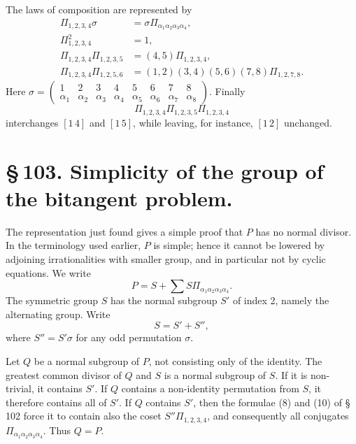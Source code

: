 \documentclass[11pt]{article}
\providecommand{\pair}[2]{[#1\,#2]}
\begin{document}
The laws of composition are represented by
\begin{align}
 \Pi_{1,2,3,4}\sigma&=\sigma\Pi_{\alpha_1\alpha_2\alpha_3\alpha_4}, \tag{8}\\
 \Pi_{1,2,3,4}^2&=1, \tag{9}\\
 \Pi_{1,2,3,4}\Pi_{1,2,3,5}&=(4,5)\Pi_{1,2,3,4}, \tag{10}\\
 \Pi_{1,2,3,4}\Pi_{1,2,5,6}&=(1,2)(3,4)(5,6)(7,8)\Pi_{1,2,7,8}. \tag{11}
\end{align}
Here \(\sigma=\begin{pmatrix}1&2&3&4&5&6&7&8\\ \alpha_1&\alpha_2&\alpha_3&\alpha_4&\alpha_5&\alpha_6&\alpha_7&\alpha_8\end{pmatrix}\). Finally
\begin{equation}
 \Pi_{1,2,3,4}\Pi_{1,2,3,5}\Pi_{1,2,3,4} \tag{12}
\end{equation}
interchanges \(\pair{1}{4}\) and \(\pair{1}{5}\), while leaving, for instance, \(\pair{1}{2}\) unchanged.

\section*{\S\,103. Simplicity of the group of the bitangent problem.}

The representation just found gives a simple proof that \(P\) has no normal divisor. In the terminology used earlier, \(P\) is simple; hence it cannot be lowered by adjoining irrationalities with smaller group, and in particular not by cyclic equations. We write
\begin{equation}
 P=S+\sum S\Pi_{\alpha_1\alpha_2\alpha_3\alpha_4}. \tag{1}
\end{equation}
The symmetric group \(S\) has the normal subgroup \(S'\) of index 2, namely the alternating group. Write
\begin{equation}
 S=S'+S'', \tag{2}
\end{equation}
where \(S''=S'\sigma\) for any odd permutation \(\sigma\).

Let \(Q\) be a normal subgroup of \(P\), not consisting only of the identity. The greatest common divisor of \(Q\) and \(S\) is a normal subgroup of \(S\). If it is non-trivial, it contains \(S'\). If \(Q\) contains a non-identity permutation from \(S\), it therefore contains all of \(S'\). If \(Q\) contains \(S'\), then the formulae (8) and (10) of \S\,102 force it to contain also the coset \(S''\Pi_{1,2,3,4}\), and consequently all conjugates \(\Pi_{\alpha_1\alpha_2\alpha_3\alpha_4}\). Thus \(Q=P\).
\end{document}
